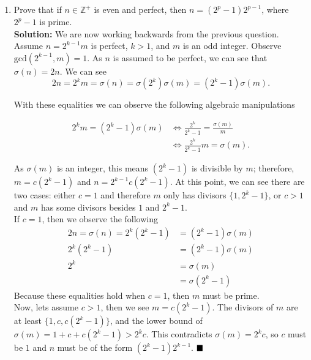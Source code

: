 \documentclass[10pt]{article}
\newcommand{\Z}{\mathbb{Z}}
\newcommand{\solution}{\color{blue}\textbf{Solution:} \color{black}}
\begin{document}
\begin{enumerate}
		\item Prove that if $n \in \Z^+$ is even and perfect, then $n = (2^p-1)2^{p-1}$, where $2^p-1$ is prime.\\
		
		\solution We are now working backwards from the previous question. Assume $n = 2^{k-1} m$ is perfect, $k > 1$, and $m$ is an odd integer. Observe $\text{gcd}(2^{k-1}, m) = 1$. As $n$ is assumed to be perfect, we can see that $\sigma(n) = 2n$. We can see 
            \[2n = 2^k m = \sigma(n) = \sigma(2^k)\sigma(m) = (2^k - 1)\sigma(m).\]

            With these equalities we can observe the following algebraic manipulations

            \begin{align*}
                2^k m = (2^k - 1)\sigma(m) &\Leftrightarrow \frac{2^k}{2^k - 1} = \frac{\sigma(m)}{m}\\
                                           &\Leftrightarrow \frac{2^k}{2^k - 1} m = \sigma(m).
            \end{align*}
            
            As $\sigma(m)$ is an integer, this means $(2^k - 1)$ is divisible by $m$; therefore, $m = c(2^k - 1)$ and $n = 2^{k-1}c(2^k -1)$. At this point, we can see there are two cases: either $c=1$ and therefore $m$ only has divisors $\{1, 2^k - 1\}$, or $c > 1$ and $m$ has some divisors besides $1$ and $2^k - 1$.\\

            If $c = 1$, then we observe the following
            \begin{align*}
                2n = \sigma(n) = 2^k (2^k - 1) &= (2^k - 1) \sigma(m)\\
                                 2^k (2^k - 1) &= (2^k - 1) \sigma(m)\\
                                 2^k  &= \sigma(m)\\
                                      &= \sigma(2^k - 1)
            \end{align*}
            Because these equalities hold when $c=1$, then $m$ must be prime.\\

            Now, lets assume $c > 1$, then we see $m = c(2^k - 1)$. The divisors of $m$ are at least $\{1, c, c(2^k - 1)\}$, and the lower bound of $\sigma(m) = 1 + c + c(2^k - 1) > 2^k c$. This contradicts $\sigma(m) = 2^kc$, so $c$ must be $1$ and $n$ must be of the form $(2^k - 1)2^{k-1}$. $\hfill\blacksquare$
		

\end{enumerate}
\end{document}
